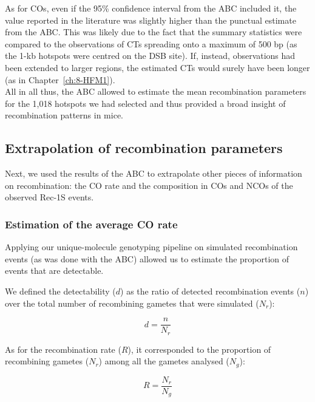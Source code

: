 As for COs, even if the 95\% confidence interval from the ABC included it, the value reported in the literature was slightly higher than the punctual estimate from the ABC\@.
This was likely due to the fact that the summary statistics were compared to the observations of CTs spreading onto a maximum of 500 bp (as the 1-kb hotspots were centred on the DSB site). 
If, instead, observations had been extended to larger regions, the estimated CTs would surely have been longer (as in Chapter~\ref{ch:8-HFM1}).\\

All in all thus, the ABC allowed to estimate the mean recombination parameters for the 1,018 hotspots we had selected and thus provided a broad insight of recombination patterns in mice.





\subsection{Extrapolation of recombination parameters}
\label{chap6:extrapolation-CO-rate}

Next, we used the results of the ABC to extrapolate other pieces of information on recombination: the CO rate and the composition in COs and NCOs of the observed Rec-1S events. 

\subsubsection{Estimation of the average CO rate}
Applying our unique-molecule genotyping pipeline on simulated recombination events (as was done with the ABC) allowed us to estimate the proportion of events that are detectable.

We defined the detectability ($d$) as the ratio of detected recombination events ($n$) over the total number of recombining gametes that were simulated ($N_r$):

\begin{equation} \label{eq:detectability}
    d = \frac{n}{N_r}
\end{equation}

As for the recombination rate ($R$), it corresponded to the proportion of recombining gametes ($N_r$) among all the gametes analysed ($N_g$):

\begin{equation} \label{eq:recombination-rate}
    R = \frac{N_r}{N_g}
\end{equation}

